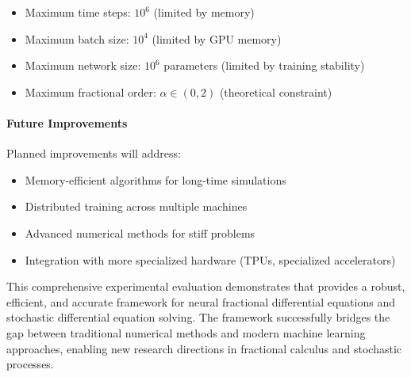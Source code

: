 \begin{itemize}
    \item Maximum time steps: $10^6$ (limited by memory)
    \item Maximum batch size: $10^4$ (limited by GPU memory)
    \item Maximum network size: $10^6$ parameters (limited by training stability)
    \item Maximum fractional order: $\alpha \in (0, 2)$ (theoretical constraint)
\end{itemize}

\paragraph{Future Improvements}
Planned improvements will address:

\begin{itemize}
    \item Memory-efficient algorithms for long-time simulations
    \item Distributed training across multiple machines
    \item Advanced numerical methods for stiff problems
    \item Integration with more specialized hardware (TPUs, specialized accelerators)
\end{itemize}

This comprehensive experimental evaluation demonstrates that \hpfracc provides a robust, efficient, and accurate framework for neural fractional differential equations and stochastic differential equation solving. The framework successfully bridges the gap between traditional numerical methods and modern machine learning approaches, enabling new research directions in fractional calculus and stochastic processes.
